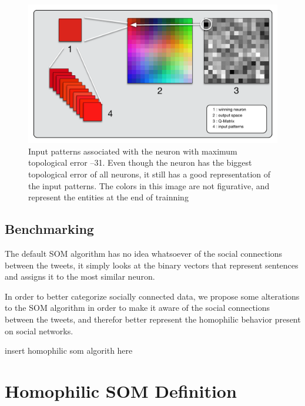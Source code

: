 \begin{figure}[htpb]
  \centering
  \includegraphics[width=0.8\linewidth]{./images/som_trainned.pdf}
  \caption{Input patterns associated with the neuron with maximum topological error --31. Even though the neuron has the biggest topological error of all neurons, it still has a good representation of the input patterns. The colors in this image are not figurative, and represent the entities at the end of trainning  }
  \label{fig:./images/som_trainned}
\end{figure}

\subsection{Benchmarking}
\label{sub:benchmarking}



The default \ac{SOM} algorithm has no idea whatsoever of the social connections between the tweets, it simply looks at the binary vectors that represent sentences and assigns it to the most similar neuron.

In order to better categorize socially connected data, we propose some alterations to the \ac{SOM} algorithm in order to make it aware of the social connections between the tweets, and therefor better represent the homophilic behavior present on social networks.

{\color{red} insert homophilic som algorith here}

\section{Homophilic SOM Definition}
\label{sec:algorithm_changes}


